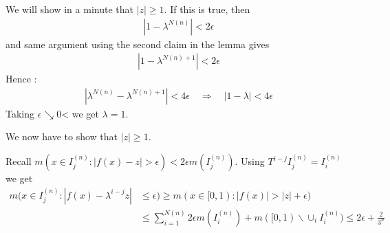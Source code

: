 \documentclass[10pt,a4paper]{report}
\newenvironment{proof}
{\begin{changemargin}{1cm}{0.5cm} 
	}%
	{\end{changemargin}
}
\newenvironment{subproof}
{\begin{changemargin}{0.5cm}{0.5cm}
	}%
	{\end{changemargin}
}
\begin{document}
\begin{proof}
\quad We will show in a minute that $|z| \geq 1$. If this is true, then
\begin{align*}
|1-\lambda^{N(n)}| < 2\epsilon
\end{align*} 
and same argument using the second claim in the lemma gives
\begin{align*}
|1- \lambda^{N(n)+1}| < 2\epsilon
\end{align*}
Hence :
\begin{align*}
|\lambda^{N(n)} - \lambda^{N(n)+1}| < 4\epsilon \quad \Rightarrow \quad |1-\lambda| < 4\epsilon
\end{align*}
Taking $\epsilon \searrow 0$< we get $\lambda =1$.

We now have to show that $|z| \geq 1$.
\begin{subproof}
 Recall $m(x\in I^{(n)}_j : |f(x)-z| > \epsilon) < 2\epsilon m(I^{(n)}_j)$. Using $T^{i-j}I_j^{(n)} = I^{(n)}_i$ we get
\begin{align*}
m(x\in I^{(n)}_j : |f(x) - \lambda^{i-j} z| &\leq \epsilon) \geq m(x\in [0,1) : |f(x)| > |z|+ \epsilon) \\
&\leq \sum_{i=1}^{N(n)} 2\epsilon m(I^{(n)}_i) + m([0,1) \backslash \cup_i I_i^{(n)}) \leq 2\epsilon + \frac{2}{3^n}
\end{align*}
\end{subproof}
\end{proof}
\end{document}
